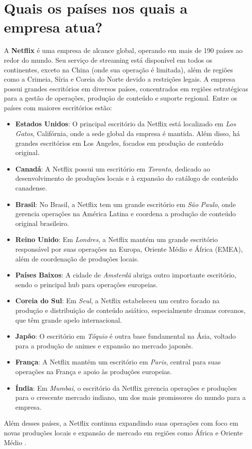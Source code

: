 \section{Quais os países nos quais a empresa atua?}

A \textbf{Netflix} é uma empresa de alcance global, operando em mais de 190 países ao redor do mundo. Seu serviço de streaming está disponível em todos os continentes, exceto na China (onde sua operação é limitada), além de regiões como a Crimeia, Síria e Coreia do Norte devido a restrições legais. A empresa possui grandes escritórios em diversos países, concentrados em regiões estratégicas para a gestão de operações, produção de conteúdo e suporte regional. Entre os países com maiores escritórios estão:

\begin{itemize}
    \item \textbf{Estados Unidos}: O principal escritório da Netflix está localizado em \textit{Los Gatos}, Califórnia, onde a sede global da empresa é mantida. Além disso, há grandes escritórios em Los Angeles, focados em produção de conteúdo original.
    
    \item \textbf{Canadá}: A Netflix possui um escritório em \textit{Toronto}, dedicado ao desenvolvimento de produções locais e à expansão do catálogo de conteúdo canadense.

    \item \textbf{Brasil}: No Brasil, a Netflix tem um grande escritório em \textit{São Paulo}, onde gerencia operações na América Latina e coordena a produção de conteúdo original brasileiro.

    \item \textbf{Reino Unido}: Em \textit{Londres}, a Netflix mantém um grande escritório responsável por suas operações na Europa, Oriente Médio e África (EMEA), além de coordenação de produções locais.

    \item \textbf{Países Baixos}: A cidade de \textit{Amsterdã} abriga outro importante escritório, sendo o principal hub para operações europeias.

    \item \textbf{Coreia do Sul}: Em \textit{Seul}, a Netflix estabeleceu um centro focado na produção e distribuição de conteúdo asiático, especialmente dramas coreanos, que têm grande apelo internacional.

    \item \textbf{Japão}: O escritório em \textit{Tóquio} é outra base fundamental na Ásia, voltado para a produção de animes e expansão no mercado japonês.

    \item \textbf{França}: A Netflix mantém um escritório em \textit{Paris}, central para suas operações na França e apoio às produções europeias.

    \item \textbf{Índia}: Em \textit{Mumbai}, o escritório da Netflix gerencia operações e produções para o crescente mercado indiano, um dos mais promissores do mundo para a empresa.

\end{itemize}

Além desses países, a Netflix continua expandindo suas operações com foco em novas produções locais e expansão de mercado em regiões como África e Oriente Médio \cite{netflix_paises}.
